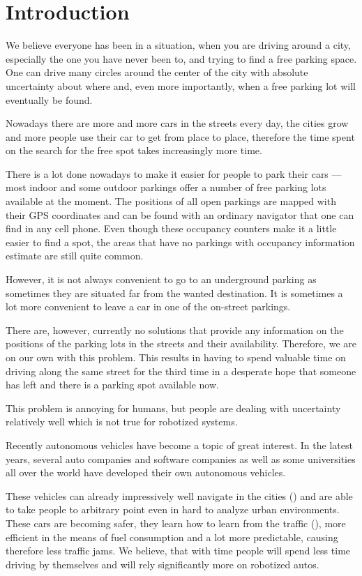 \chapter{Introduction} %
\label{cha:introduction}
    We believe everyone has been in a situation, when you are driving around a city, especially the one you have never been to, and trying to find a free parking space. One can drive many circles around the center of the city with absolute uncertainty about where and, even more importantly, when a free parking lot will eventually be found.

    Nowadays there are more and more cars in the streets every day, the cities grow and more people use their car to get from place to place, therefore the time spent on the search for the free spot takes increasingly more time.

    There is a lot done nowadays to make it easier for people to park their cars --- most indoor and some outdoor parkings offer a number of free parking lots available at the moment. The positions of all open parkings are mapped with their GPS coordinates and can be found with an ordinary navigator that one can find in any cell phone. Even though these occupancy counters make it a little easier to find a spot, the areas that have no parkings with occupancy information estimate are still quite common.

    However, it is not always convenient to go to an underground parking as sometimes they are situated far from the wanted destination. It is sometimes a lot more convenient to leave a car in one of the on-street parkings.

    There are, however, currently no solutions that provide any information on the positions of the parking lots in the streets and their availability. Therefore, we are on our own with this problem. This results in having to spend valuable time on driving along the same street for the third time in a desperate hope that someone has left and there is a parking spot available now.

    This problem is annoying for humans, but people are dealing with uncertainty relatively well which is not true for robotized systems.

    Recently autonomous vehicles have become a topic of great interest.
    In the latest years, several auto companies and software companies as well as some universities all over the world have developed their own autonomous vehicles.

    These vehicles can already impressively well navigate in the cities (\cite{stanley_auto_car,perceprion_drivec_car,lima13}) and are able to take people to arbitrary point even in hard to analyze urban environments. These cars are becoming safer, they learn how to learn from the traffic (\cite{behaviour_learning,spinello10:multiclass}), more efficient in the means of fuel consumption and a lot more predictable, causing therefore less traffic jams. We believe, that with time people will spend less time driving by themselves and will rely significantly more on robotized autos.

